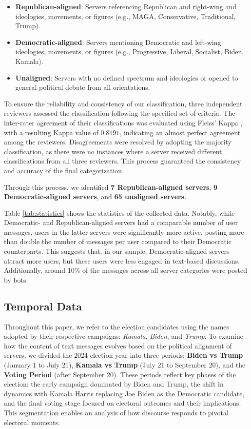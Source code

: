 \begin{itemize}
    \item \textbf{Republican-aligned}: Servers referencing Republican and right-wing and ideologies, movements, or figures (e.g., MAGA, Conservative, Traditional, Trump).  
    \item \textbf{Democratic-aligned}: Servers mentioning Democratic and left-wing ideologies, movements, or figures (e.g., Progressive, Liberal, Socialist, Biden, Kamala).  
    \item \textbf{Unaligned}: Servers with no defined spectrum and ideologies or opened to general political debate from all orientations.
\end{itemize}

To ensure the reliability and consistency of our classification, three independent reviewers assessed the classification following the specified set of criteria. The inter-rater agreement of their classifications was evaluated using Fleiss' Kappa \cite{fleiss1971measuring}, with a resulting Kappa value of \( 0.8191 \), indicating an almost perfect agreement among the reviewers. Disagreements were resolved by adopting the majority classification, as there were no instances where a server received different classifications from all three reviewers. This process guaranteed the consistency and accuracy of the final categorization.

Through this process, we identified \textbf{7 Republican-aligned servers}, \textbf{9 Democratic-aligned servers}, and \textbf{65 unaligned servers}.

Table \ref{tab:statistics} shows the statistics of the collected data. Notably, while Democratic- and Republican-aligned servers had a comparable number of user messages, users in the latter servers were significantly more active, posting more than double the number of messages per user compared to their Democratic counterparts. 
This suggests that, in our sample, Democratic-aligned servers attract more users, but these users were less engaged in text-based discussions. Additionally, around 10\% of the messages across all server categories were posted by bots. 

\subsection{Temporal Data} 

Throughout this paper, we refer to the election candidates using the names adopted by their respective campaigns: \textit{Kamala}, \textit{Biden}, and \textit{Trump}. To examine how the content of text messages evolves based on the political alignment of servers, we divided the 2024 election year into three periods: \textbf{Biden vs Trump} (January 1 to July 21), \textbf{Kamala vs Trump} (July 21 to September 20), and the \textbf{Voting Period} (after September 20). These periods reflect key phases of the election: the early campaign dominated by Biden and Trump, the shift in dynamics with Kamala Harris replacing Joe Biden as the Democratic candidate, and the final voting stage focused on electoral outcomes and their implications. This segmentation enables an analysis of how discourse responds to pivotal electoral moments.

